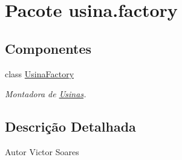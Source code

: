 \hypertarget{namespaceusina_1_1factory}{\section{Pacote usina.\-factory}
\label{namespaceusina_1_1factory}
}
\subsection*{Componentes}
\begin{DoxyCompactItemize}
\item 
class \hyperlink{classusina_1_1factory_1_1_usina_factory}{Usina\-Factory}
\begin{DoxyCompactList}\small\item\em Montadora de \hyperlink{enumusina_1_1factory_1_1_usina_factory_1_1_usinas}{Usinas}. \end{DoxyCompactList}\end{DoxyCompactItemize}


\subsection{Descrição Detalhada}
\begin{DoxyAuthor}{Autor}
Victor Soares 
\end{DoxyAuthor}
